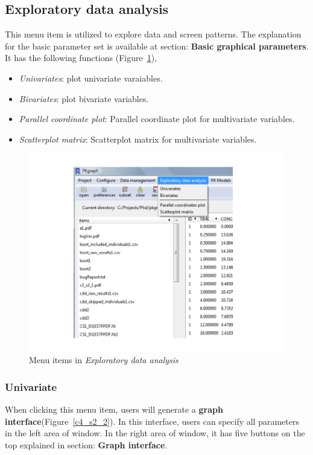 \documentclass[a4paper]{article}
\begin{document}
\subsection{Exploratory data analysis}
This menu item is utilized to explore data and screen patterns. 
The explanation for the basic parameter set is available at section: \textbf{Basic graphical parameters}.
It has the following functions (Figure~\ref{eda}),
\begin{itemize}
	\item \textit{Univariates}: plot univariate varaiables. 
	\item \textit{Bivariates}: plot bivariate variables.
	\item \textit{Parallel coordinate plot}: Parallel coordinate plot for multivariate variables.
	\item \textit{Scatterplot matrix}: Scatterplot matrix for multivariate variables.
\end{itemize}
\begin{figure}[h!tb] \centering
\includegraphics[scale=0.6]{eda.pdf}
\caption{Menu items in \textit{Exploratory data analysis}}
\label{eda}
\end{figure}
\subsubsection{Univariate}
When clicking this menu item, users will generate a 
\textbf{graph interface}(Figure~\ref{c4_s2_2}). In this interface, users can 
specify all parameters in the left area of window. In the right area of window, 
it has five buttons on the top explained in section: \textbf{Graph interface}.
\end{document}
